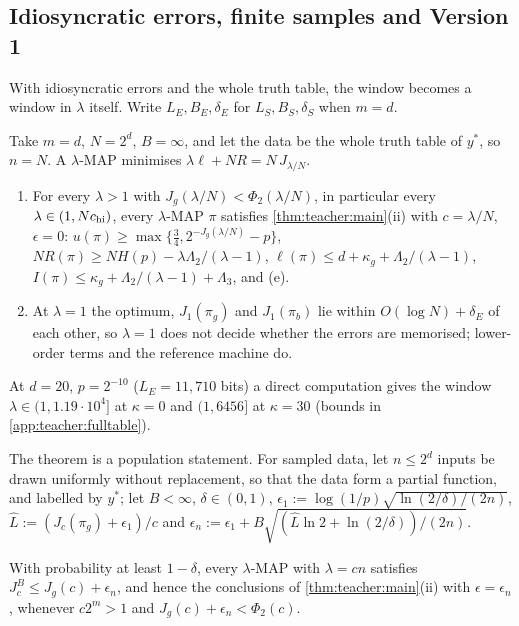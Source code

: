 \subsection{Idiosyncratic errors, finite samples and Version 1}\label{sec:teacher:more}

With idiosyncratic errors and the whole truth table, the window becomes a window in $\lambda$ itself. Write $L_E,B_E,\delta_E$ for $L_S,B_S,\delta_S$ when $m=d$.

\begin{corollary}\label{cor:teacher:fulltable}
Take $m=d$, $N=2^d$, $B=\infty$, and let the data be the whole truth table of $y^*$, so $n=N$. A $\lambda$-MAP minimises $\lambda\ell+NR=N\,J_{\lambda/N}$.
\begin{enumerate}[label=(\roman*)]
\item For every $\lambda>1$ with $J_g(\lambda/N)<\Phi_2(\lambda/N)$, in particular every $\lambda\in(1,Nc_{\rm hi})$, every $\lambda$-MAP $\pi$ satisfies \cref{thm:teacher:main}(ii) with $c=\lambda/N$, $\epsilon=0$: $u(\pi)\ge\max\{\frac34,2^{-J_g(\lambda/N)}-p\}$, $NR(\pi)\ge NH(p)-\lambda\Lambda_2/(\lambda-1)$, $\ell(\pi)\le d+\kappa_g+\Lambda_2/(\lambda-1)$, $I(\pi)\le\kappa_g+\Lambda_2/(\lambda-1)+\Lambda_3$, and (e).
\item At $\lambda=1$ the optimum, $J_1(\pi_g)$ and $J_1(\pi_b)$ lie within $O(\log N)+\delta_E$ of each other, so $\lambda=1$ does not decide whether the errors are memorised; lower-order terms and the reference machine do.
\end{enumerate}
At $d=20$, $p=2^{-10}$ ($L_E=11{,}710$ bits) a direct computation gives the window $\lambda\in(1,1.19\cdot10^4]$ at $\kappa=0$ and $(1,6456]$ at $\kappa=30$ (bounds in \cref{app:teacher:fulltable}).
\end{corollary}

The theorem is a population statement. For sampled data, let $n\le2^d$ inputs be drawn uniformly without replacement, so that the data form a partial function, and labelled by $y^*$; let $B<\infty$, $\delta\in(0,1)$, $\epsilon_1:=\log(1/p)\sqrt{\ln(2/\delta)/(2n)}$, $\hat L:=(J_c(\pi_g)+\epsilon_1)/c$ and $\epsilon_n:=\epsilon_1+B\sqrt{(\hat L\ln2+\ln(2/\delta))/(2n)}$.

\begin{corollary}\label{cor:teacher:sampled}
With probability at least $1-\delta$, every $\lambda$-MAP with $\lambda=cn$ satisfies $J^B_c\le J_g(c)+\epsilon_n$, and hence the conclusions of \cref{thm:teacher:main}(ii) with $\epsilon=\epsilon_n$, whenever $c2^m>1$ and $J_g(c)+\epsilon_n<\Phi_2(c)$.
\end{corollary}

